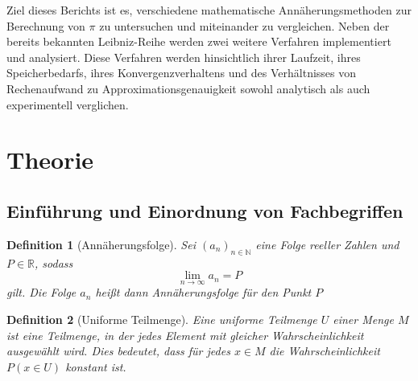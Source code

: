 \documentclass{scrartcl}
\newtheorem{definition}{Definition}
\theoremstyle{definition}
\newtheorem{approximation sequence}{Annäherungsfolge}
\begin{document}
Ziel dieses Berichts ist es, verschiedene mathematische Annäherungsmethoden zur
Berechnung von \(\pi\) zu untersuchen und miteinander zu vergleichen.
Neben der bereits bekannten Leibniz-Reihe werden zwei weitere Verfahren
implementiert und analysiert.
Diese Verfahren werden hinsichtlich ihrer Laufzeit, ihres Speicherbedarfs,
ihres Konvergenzverhaltens und des Verhältnisses von Rechenaufwand zu
Approximationsgenauigkeit sowohl analytisch als auch experimentell verglichen.


\section{Theorie}

\subsection{Einführung und Einordnung von Fachbegriffen}

\begin{definition}[Annäherungsfolge]
    Sei \((a_n)_{n \in \mathbb{N}}\) eine Folge reeller Zahlen und \(P \in \mathbb{R}\), sodass
    \[\lim_{n \to \infty} a_n = P \] gilt. Die Folge \(a_n\) heißt dann Annäherungsfolge für den Punkt \(P\)

\end{definition}

\begin{definition}[Uniforme Teilmenge]
    Eine uniforme Teilmenge \(U\) einer Menge \(M\) ist eine Teilmenge, in der
    jedes Element mit gleicher Wahrscheinlichkeit ausgewählt wird.
    Dies bedeutet, dass für jedes \(x \in M\) die Wahrscheinlichkeit \(P(x \in U)\)
    konstant ist.
\end{definition}
\end{document}
